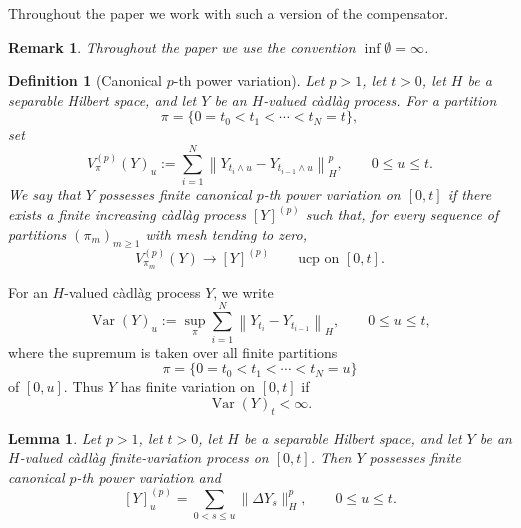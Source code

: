 \documentclass[a4paper,10pt]{article}
\newtheorem{lemma}[thm]{Lemma}
\newtheorem{defin}[thm]{Definition}
\newtheorem{rema}[thm]{Remark}
\begin{document}
Throughout the paper we work with such a version of the compensator.

\begin{rema}
Throughout the paper we use the convention \(\inf\emptyset=\infty\).
\end{rema}

\begin{defin}[Canonical \(p\)-th power variation]
Let \(p>1\), let \(t>0\), let \(H\) be a separable Hilbert space, and
let \(Y\) be
an \(H\)-valued càdlàg process. For a partition
\[
        \pi=\{0=t_0<t_1<\cdots<t_N=t\},
\]
set
\[
V_\pi^{(p)}(Y)_u
:=
\sum_{i=1}^N
\left\lVert
Y_{t_i\wedge u}-Y_{t_{i-1}\wedge u}
\right\rVert_H^p,
\qquad 0\le u\le t.
\]
We say that \(Y\) possesses finite canonical \(p\)-th power variation
on \([0,t]\) if there exists a finite increasing càdlàg process
\([Y]^{(p)}\) such that, for every sequence of partitions
\((\pi_m)_{m\ge1}\) with mesh tending to zero,
\[
        V_{\pi_m}^{(p)}(Y)
        \longrightarrow
        [Y]^{(p)}
        \qquad\text{ucp on }[0,t].
\]
\end{defin}
For an \(H\)-valued càdlàg process \(Y\), we write
\[
\operatorname{Var}(Y)_u
:=
\sup_{\pi}
\sum_{i=1}^{N}
\left\lVert
Y_{t_i}-Y_{t_{i-1}}
\right\rVert_H,
\qquad 0\le u\le t,
\]
where the supremum is taken over all finite partitions
\[
        \pi=\{0=t_0<t_1<\cdots<t_N=u\}
\]
of \([0,u]\). Thus \(Y\) has finite variation on \([0,t]\) if
\[
        \operatorname{Var}(Y)_t<\infty.
\]
\begin{lemma}
Let \(p>1\), let \(t>0\), let \(H\) be a separable Hilbert space, and
let \(Y\) be an \(H\)-valued càdlàg finite-variation process on
\([0,t]\). Then \(Y\) possesses finite canonical
\(p\)-th power variation and
\[
        [Y]^{(p)}_u
        =
        \sum_{0<s\le u}
        \lVert\Delta Y_s\rVert_H^p,
        \qquad 0\le u\le t.
\]
\end{lemma}
\end{document}
